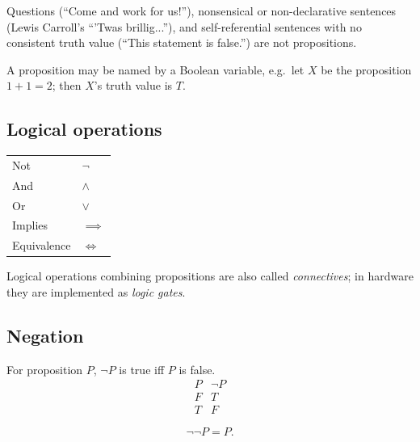 \begin{example}
Questions (``Come and work for us!''), nonsensical or non-declarative sentences (Lewis Carroll's ``'Twas brillig...''), and self-referential sentences with no consistent truth value (``This statement is false.'') are not propositions.
\end{example}

\begin{note}
A proposition may be named by a Boolean variable, e.g.\ let $X$ be the proposition $1+1=2$; then $X$'s truth value is $T$.
\end{note}

\subsection{Logical operations}
\label{sec:4-4}

\begin{note}
\begin{center}
\begin{tabular}{ll}
Not & $\neg$ \\
And & $\wedge$ \\
Or & $\vee$ \\
Implies & $\implies$ \\
Equivalence & $\iff$
\end{tabular}
\end{center}
Logical operations combining propositions are also called \emph{connectives}; in hardware they are implemented as \emph{logic gates}.
\end{note}

\subsection{Negation}
\label{sec:4-5}

\begin{definition}[Negation]
For proposition $P$, $\neg P$ is true iff $P$ is false.
\[
\begin{array}{c|c}
P & \neg P \\ \hline
F & T \\
T & F
\end{array}
\]
\end{definition}

\begin{proposition}
\[
\neg\neg P = P.
\]
\end{proposition}

